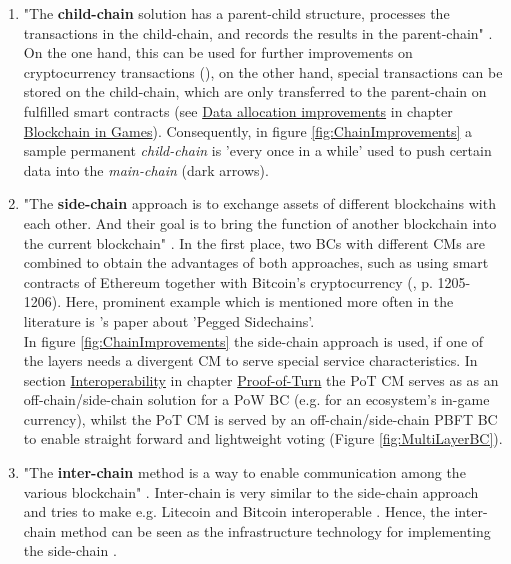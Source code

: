 \begin{enumerate}
	\item "The \textbf{child-chain} solution has a parent-child structure, processes the transactions in the child-chain, and records the results in the parent-chain" \cite[1206]{Kim.2018}.
	On the one hand, this can be used for further improvements on cryptocurrency transactions (\citet[1206]{Kim.2018}),
	on the other hand, special transactions can be stored on the child-chain,
	which are only transferred to the parent-chain on fulfilled
	smart contracts (see \hyperref[sec:DataAllocationImprovements]{Data allocation improvements} in chapter \hyperref[chap:BlockchainInGames]{Blockchain in Games}).
	Consequently, in figure \ref{fig:ChainImprovements} a sample permanent \textit{child-chain} 
	is 'every once in a while' used to push certain data into the \textit{main-chain} (dark arrows).
	
	\item "The \textbf{side-chain} approach is to exchange assets of different blockchains with each other.
	And their goal is to bring the function of another blockchain into the current blockchain" \cite[1205]{Kim.2018}.
	In the first place, two \gls{BC}s with different \gls{CM}s are combined to obtain the advantages of both approaches, such as using smart contracts of Ethereum together with Bitcoin's cryptocurrency (\citet{Kim.2018}, p. 1205-1206).
	Here, prominent example which is mentioned more often in the literature is \citet{Back.2014}'s paper about 'Pegged Sidechains'. \\
	In figure \ref{fig:ChainImprovements} the side-chain approach is used,
	if one of the layers needs a divergent \gls{CM} to serve special service characteristics.
	In section \hyperref[sec:Interoperability]{Interoperability} in chapter \hyperref[chap:PoT]{Proof-of-Turn}
	the \gls{PoT} \gls{CM} serves as as an off-chain/side-chain solution for a \gls{PoW} \gls{BC}
	(e.g. for an ecosystem's in-game currency), whilst the
	\gls{PoT} \gls{CM} is served by an off-chain/side-chain \gls{PBFT} \gls{BC} to enable straight forward and lightweight voting (Figure \ref{fig:MultiLayerBC}).
	
	\item "The \textbf{inter-chain} method is a way to enable communication among the various blockchain" \cite[1206]{Kim.2018}.
	Inter-chain is very similar to the side-chain approach and tries to make e.g. Litecoin and Bitcoin interoperable \cite[1206]{Kim.2018}.
	Hence, the inter-chain method can be seen as the infrastructure technology for implementing the side-chain \cite[1206]{Kim.2018}.
\end{enumerate}
